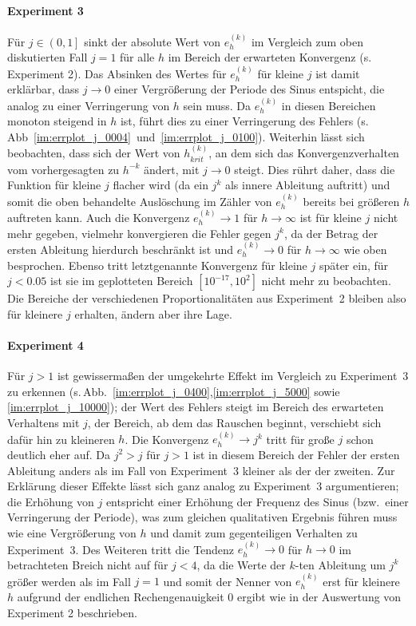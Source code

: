 \documentclass[smallheadings]{scrartcl}
\begin{document}
\paragraph{Experiment 3}

Für $j\in\left(0,1\right]$ sinkt der absolute Wert von $e_h^{(k)}$ im Vergleich zum oben diskutierten Fall $j=1$ für alle $h$ im Bereich der erwarteten Konvergenz (s.\,Experiment 2). Das Absinken des Wertes für $e_h^{(k)}$ für kleine $j$ ist damit erklärbar, dass $j\rightarrow 0$ einer Vergrößerung der Periode des Sinus entspicht, die analog zu einer Verringerung von $h$ sein muss. Da $e_h^{(k)}$ in diesen Bereichen monoton steigend in $h$ ist, führt dies zu einer Verringerung des Fehlers (s.\,Abb~\ref{im:errplot_j_0004}~und~\ref{im:errplot_j_0100}). Weiterhin lässt sich beobachten, dass sich der Wert von $h_{krit}^{(k)}$, an dem sich das Konvergenzverhalten vom vorhergesagten zu $h^{-k}$ ändert, mit $j\rightarrow 0$ steigt. Dies rührt daher, dass die Funktion für kleine $j$ flacher wird (da ein $j^k$ als innere Ableitung auftritt) und somit die oben behandelte Auslöschung im Zähler von $e_h^{(k)}$ bereits bei größeren $h$ auftreten kann. Auch die Konvergenz $e_h^{(k)}\rightarrow 1$ für $h\rightarrow \infty$ ist für kleine $j$ nicht mehr gegeben, vielmehr konvergieren die Fehler gegen $j^k$, da der Betrag der ersten Ableitung hierdurch beschränkt ist und $e_h^{(k)}\rightarrow 0$ für $h\rightarrow \infty$ wie oben besprochen. Ebenso tritt letztgenannte Konvergenz für kleine $j$ später ein, für $j<0.05$ ist sie im geplotteten Bereich $\left[10^{-17},10^{2}\right]$ nicht mehr zu beobachten. Die Bereiche der verschiedenen Proportionalitäten aus Experiment~2 bleiben also für kleinere $j$ erhalten, ändern aber ihre Lage.

\paragraph{Experiment 4}

Für $j>1$ ist gewissermaßen der umgekehrte Effekt im Vergleich zu Experiment~3 zu erkennen (s.\,Abb.~\ref{im:errplot_j_0400},\ref{im:errplot_j_5000} sowie \ref{im:errplot_j_10000}); der Wert des Fehlers steigt im Bereich des erwarteten Verhaltens  mit $j$, der Bereich, ab dem das Rauschen beginnt, verschiebt sich dafür hin zu kleineren $h$. Die Konvergenz $e_h^{(k)}\rightarrow j^k$ tritt für große $j$ schon deutlich eher auf. Da $j^2>j$ für $j>1$ ist in diesem Bereich der Fehler der ersten Ableitung anders als im Fall von Experiment~3 kleiner als der der zweiten. Zur Erklärung dieser Effekte lässt sich ganz analog zu Experiment~3 argumentieren; die Erhöhung von $j$ entspricht einer Erhöhung der Frequenz des Sinus (bzw.~einer Verringerung der Periode), was zum gleichen qualitativen Ergebnis führen muss wie eine Vergrößerung von $h$ und damit zum  gegenteiligen Verhalten zu Experiment~3. Des Weiteren tritt die Tendenz $e_h^{(k)}\rightarrow 0$ für $h\rightarrow 0$ im betrachteten Breich nicht auf für $j<4$, da die Werte der $k$-ten Ableitung um $j^k$ größer werden als im Fall $j=1$ und somit der Nenner von $e_h^{(k)}$ erst für kleinere $h$ aufgrund der endlichen Rechengenauigkeit $0$ ergibt wie in der Auswertung von Experiment 2 beschrieben.
\end{document}
